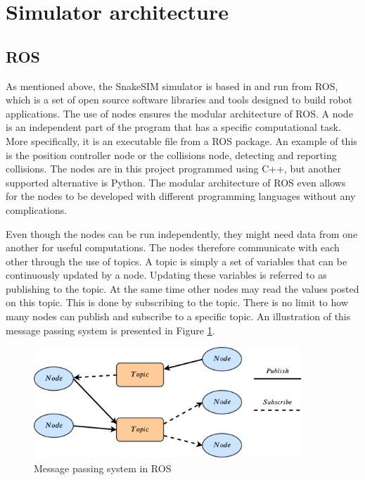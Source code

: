 \section{Simulator architecture}\label{sec:sim_architecture}

\subsection{ROS}

As mentioned above, the SnakeSIM simulator is based in and run from ROS, which is a set of open source software libraries and tools designed to build robot applications.
The use of nodes ensures the modular architecture of ROS. A node is an independent part of the program that has a specific computational task. More specifically, it is an executable file from a ROS package. An example of this is the position controller node or the collisions node, detecting and reporting collisions. The nodes are in this project programmed using C++, but another supported alternative is Python. The modular architecture of ROS even allows for the nodes to be developed with different programming languages without any complications.

Even though the nodes can be run independently, they might need data from one another for useful computations. The nodes therefore communicate with each other through the use of topics. A topic is simply a set of variables that can be continuously updated by a node. Updating these variables is referred to as publishing to the topic. At the same time other nodes may read the values posted on this topic. This is done by subscribing to the topic. There is no limit to how many nodes can publish and subscribe to a specific topic. An illustration of this message passing system is presented in Figure \ref{fig:nodesntopics}.

\begin{figure}
    \centering
    \includegraphics[width=0.9\textwidth]{figures/simulator/nodesntopics.pdf}
    \caption{Message passing system in ROS}
    \label{fig:nodesntopics}
\end{figure}

